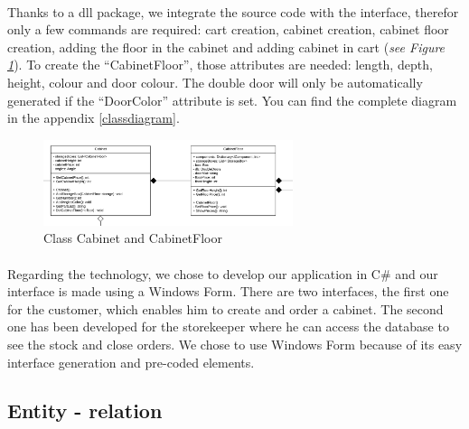 \documentclass[12pt,oneside]{report}
\begin{document}
        \paragraph{}
        Thanks to a dll package, we integrate the source code with the interface, therefor only a few commands are required: cart creation, cabinet creation, cabinet floor creation, adding the floor in the cabinet and adding cabinet in cart (\textit{see Figure \ref{cabinetclass}}). To create the “CabinetFloor”, those attributes are needed: length, depth, height, colour and door colour. The double door will only be automatically generated if the “DoorColor” attribute is set. You can find the complete diagram in the appendix \ref{classdiagram}.
        \vspace{\baselineskip}
        
        \begin{figure}[h!]
            \centering
			\includegraphics[width = 0.65\textwidth]{Figures/CabinetClass.png}
			\caption{Class Cabinet and CabinetFloor}
			\label{cabinetclass}
		\end{figure} 
		
        \paragraph{}
        Regarding the technology, we chose to develop our application in C\# and our interface is made using a Windows Form. There are two interfaces, the first one for the customer, which enables him to create and order a cabinet. The second one has been developed for the storekeeper where he can access the database to see the stock and close orders. We chose to use Windows Form because of its easy interface generation and pre-coded elements.
 
    \newpage
    \subsection{Entity - relation}
        \vspace{\baselineskip}
        
\end{document}
